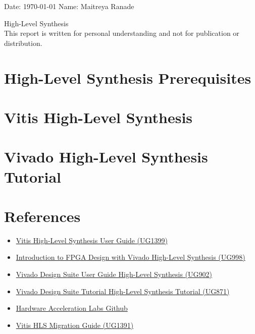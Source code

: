\documentclass{report}
\begin{document}
	\onehalfspacing
	Date: \today{} \hfill{} Name: Maitreya Ranade
	\begin{center}
		\vspace*{\fill}
		{\LARGE High-Level Synthesis} \\
		This report is written for personal understanding and not for publication or distribution.
		\vspace*{\fill}
	\end{center}
	
	\pagebreak
	\singlespacing
	\tableofcontents
	\pagebreak       

  \chapter{High-Level Synthesis Prerequisites}   
  
  \clearpage


  \chapter{Vitis High-Level Synthesis}   
  
  \clearpage

  \chapter{Vivado High-Level Synthesis Tutorial}   
  
  \clearpage

  \chapter{References}
  \begin{itemize}     
    \item \href{https://www.xilinx.com/support/documentation/sw_manuals/xilinx2021_1/ug1399-vitis-hls.pdf}{Vitis High-Level Synthesis User Guide (UG1399)}
    \item \href{https://www.xilinx.com/support/documentation/sw_manuals/ug998-vivado-intro-fpga-design-hls.pdf}{Introduction to FPGA Design with Vivado High-Level Synthesis (UG998)}
    \item \href{https://www.xilinx.com/support/documentation/sw_manuals/xilinx2018_3/ug902-vivado-high-level-synthesis.pdf}{Vivado Design Suite User Guide High-Level Synthesis (UG902)}
    \item \href{https://www.xilinx.com/support/documentation/sw_manuals/xilinx2014_2/ug871-vivado-high-level-synthesis-tutorial.pdf}{Vivado Design Suite Tutorial High-Level Synthesis Tutorial (UG871)}
    \item \href{https://github.com/Xilinx/Vitis-Tutorials/tree/2021.1/Hardware_Acceleration}{Hardware Acceleration Labs Github}
    \item \href{https://www.xilinx.com/support/documentation/sw_manuals/xilinx2020_1/ug1391-vitis-hls-migration-guide.pdf}{Vitis HLS Migration Guide (UG1391)}
  \end{itemize}


	
\end{document}
